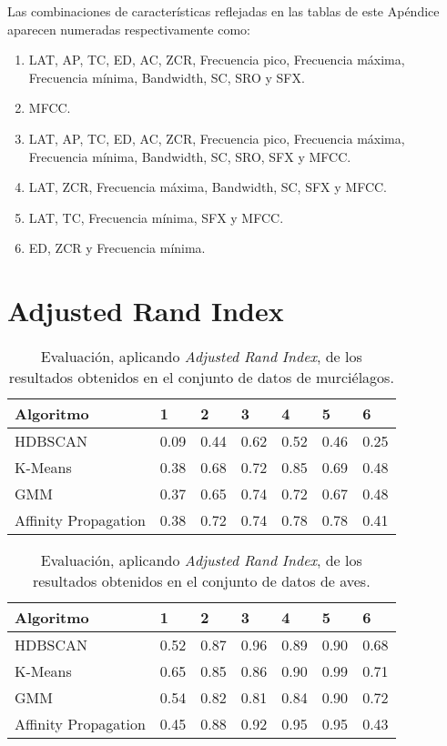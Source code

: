 Las combinaciones de características reflejadas en las tablas de este Apéndice aparecen numeradas respectivamente como:

\begin{enumerate}
    \item LAT, AP, TC, ED, AC, ZCR, Frecuencia pico, Frecuencia máxima, Frecuencia mínima, Bandwidth, SC, SRO y SFX\@. %
    \item MFCC\@. %
    \item LAT, AP, TC, ED, AC, ZCR, Frecuencia pico, Frecuencia máxima, Frecuencia mínima, Bandwidth, SC, SRO, SFX y MFCC\@.
    \item LAT, ZCR, Frecuencia máxima, Bandwidth, SC, SFX y MFCC\@. %
    \item LAT, TC, Frecuencia mínima, SFX y MFCC\@. %
    \item ED, ZCR y Frecuencia mínima.
\end{enumerate}

\section{Adjusted Rand Index}\label{sec:ARI-evaluation}

\begin{table}[H]
    \centering
    \begin{tabular}{lllllll}
        \hline
        Algoritmo & 1 & 2 & 3 & 4 & 5 & 6  \\ \hline
        HDBSCAN & 0.09 & 0.44 & 0.62 & 0.52 & 0.46 & 0.25 \\
        K-Means & 0.38 & 0.68 & 0.72 & \cellcolor[HTML]{FFFC9E}0.85 & 0.69 & 0.48 \\
        GMM & 0.37 & 0.65 & 0.74 & 0.72 & 0.67 & 0.48 \\
        Affinity Propagation & 0.38 & 0.72 & 0.74 & 0.78 & 0.78 & 0.41
    \end{tabular}
    \caption{Evaluación, aplicando \textit{Adjusted Rand Index}, de los resultados obtenidos en el conjunto de datos de murciélagos.}
    \label{table:bats-ari}
\end{table}

\begin{table}[H]
    \centering
    \begin{tabular}{lllllll}
        \hline
        Algoritmo & 1 & 2 & 3 & 4 & 5 & 6  \\ \hline
        HDBSCAN & 0.52 & 0.87 & 0.96 & 0.89 & 0.90 & 0.68 \\
        K-Means & 0.65 & 0.85 & 0.86 & 0.90 & \cellcolor[HTML]{FFFC9E}0.99 & 0.71 \\
        GMM & 0.54 & 0.82 & 0.81 & 0.84 & 0.90 & 0.72 \\
        Affinity Propagation & 0.45 & 0.88 & 0.92 & 0.95 & 0.95 & 0.43
    \end{tabular}
    \caption{Evaluación, aplicando \textit{Adjusted Rand Index}, de los resultados obtenidos en el conjunto de datos de aves.}
    \label{table:birds-ari}
\end{table}

